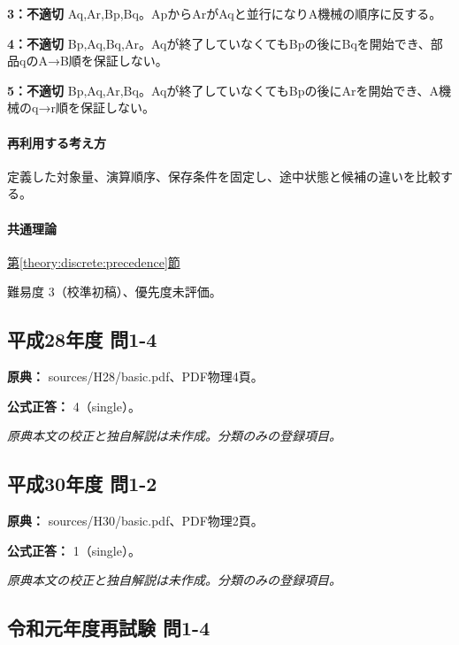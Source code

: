 \noindent\textbf{3：不適切} Aq,Ar,Bp,Bq。ApからArがAqと並行になりA機械の順序に反する。\par

\noindent\textbf{4：不適切} Bp,Aq,Bq,Ar。Aqが終了していなくてもBpの後にBqを開始でき、部品qのA→B順を保証しない。\par

\noindent\textbf{5：不適切} Bp,Aq,Ar,Bq。Aqが終了していなくてもBpの後にArを開始でき、A機械のq→r順を保証しない。\par

\paragraph{再利用する考え方} 定義した対象量、演算順序、保存条件を固定し、途中状態と候補の違いを比較する。

\paragraph{共通理論} \hyperref[theory:discrete:precedence]{第\ref*{theory:discrete:precedence}節}

\par 難易度 3（校準初稿）、優先度未評価。

\subsection{平成28年度 問1-4}
\label{q:h28-reg-basic-1-4}

\noindent\textbf{原典：} sources/H28/basic.pdf、PDF物理4頁。

\textbf{公式正答：} 4（single）。

\par\textit{原典本文の校正と独自解説は未作成。分類のみの登録項目。}

\subsection{平成30年度 問1-2}
\label{q:h30-reg-basic-1-2}

\noindent\textbf{原典：} sources/H30/basic.pdf、PDF物理2頁。

\textbf{公式正答：} 1（single）。

\par\textit{原典本文の校正と独自解説は未作成。分類のみの登録項目。}

\subsection{令和元年度再試験 問1-4}
\label{q:r01-ret-basic-1-4}

